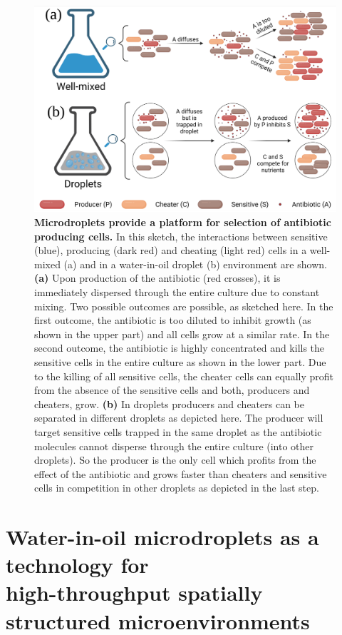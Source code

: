\begin{figure}
\includegraphics[width=\linewidth]{graphics/2025_09_28_droplets_fig1_new.png}

\caption{\textbf{Microdroplets provide a platform for selection of antibiotic producing cells.} In this sketch, the interactions between sensitive (blue), producing (dark red) and cheating (light red) cells in a well-mixed (a) and in a water-in-oil droplet (b) environment are shown. \textbf{(a)} Upon production of the antibiotic (red crosses), it is immediately dispersed through the entire culture due to constant mixing. Two possible outcomes are possible, as sketched here. In the first outcome, the antibiotic is too diluted to inhibit growth (as shown in the upper part) and all cells grow at a similar rate. In the second outcome, the antibiotic is highly concentrated and kills the sensitive cells in the entire culture as shown in the lower part. Due to the killing of all sensitive cells, the cheater cells can equally profit from the absence of the sensitive cells and both, producers and cheaters, grow. \textbf{(b)} In droplets producers and cheaters can be separated in different droplets as depicted here. The producer will target sensitive cells trapped in the same droplet as the antibiotic molecules cannot disperse through the entire culture (into other droplets). So the producer is the only cell which profits from the effect of the antibiotic and grows faster than cheaters and sensitive cells in competition in other droplets as depicted in the last step.}
\label{fig:intro_droplets_idea}
\end{figure}

\section{Water-in-oil microdroplets as a technology for \\ high-throughput spatially structured microenvironments}

